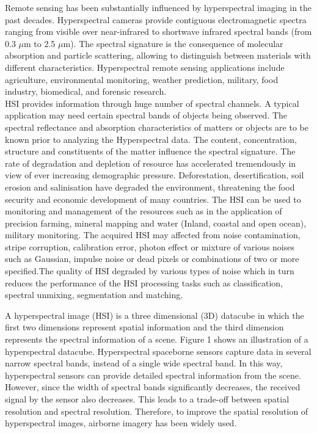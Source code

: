 \documentclass{article}
\begin{document}
Remote sensing has been substantially influenced by hyperspectral imaging in the past decades. Hyperspectral cameras provide contiguous electromagnetic spectra ranging from visible over near-infrared to shortwave infrared spectral bands (from 0.3 $\mu$m to 2.5 $\mu$m). The spectral signature is the consequence of molecular absorption and particle scattering, allowing to distinguish between materials with different characteristics. Hyperspectral remote sensing applications include agriculture, environmental monitoring, weather prediction, military, food industry, biomedical, and forensic research.\\

HSI provides information through huge number of spectral channels. A typical application may need certain spectral bands of objects being observed. The spectral reflectance and absorption characteristics of matters or objects are to be known prior to analyzing the Hyperspectral data. The content, concentration, structure and constituents of the matter influence the spectral signature. The rate of degradation and depletion of resource has accelerated tremendously in view of ever increasing demographic pressure. Deforestation, desertification, soil erosion and salinisation have degraded the environment, threatening the food security and economic development of many countries. The HSI can be used to monitoring and management of the resources such as in the application of precision farming, mineral mapping and water (Inland, coastal and open ocean), military monitoring. The acquired HSI may affected from noise contamination, stripe corruption, calibration error, photon effect or mixture of various noises such as Gaussian, impulse noise or dead pixels or combinations of two or more specified.The quality of HSI degraded by various types of noise which in turn reduces the performance of the HSI processing tasks such as classification, spectral unmixing, segmentation and matching.

A hyperspectral image (HSI) is a three dimensional (3D) datacube in which the first two dimensions represent spatial information and the third dimension represents the spectral information of a scene. Figure 1 shows an illustration of a hyperspectral datacube. Hyperspectral spaceborne sensors capture data in several narrow spectral bands, instead of a single wide spectral band. In this way, hyperspectral sensors can provide detailed spectral information from the scene. However, since the width of spectral bands significantly decreases, the received signal by the sensor also decreases. This leads to a trade-off between spatial resolution and spectral resolution. Therefore, to improve the spatial resolution of hyperspectral images, airborne imagery has been widely used.\\
\end{document}
